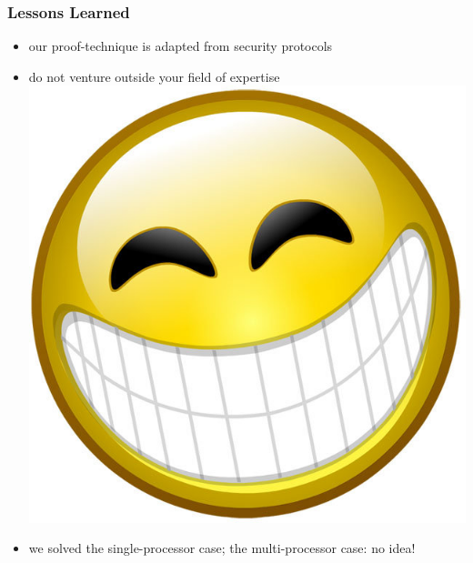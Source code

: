 \documentclass[dvipsnames,14pt,t]{beamer}
\begin{document}
  \begin{frame}[c]
  \frametitle{Lessons Learned}

  \begin{itemize}
  \item our proof-technique is adapted from security 
  protocols\bigskip
 
  \item do not venture outside your field of expertise 
  \includegraphics[scale=0.03]{pics/smiley.jpg}
  \bigskip

  \item we solved the single-processor case; the multi-processor 
  case: no idea!
  \end{itemize}

  \end{frame}
\end{document}
